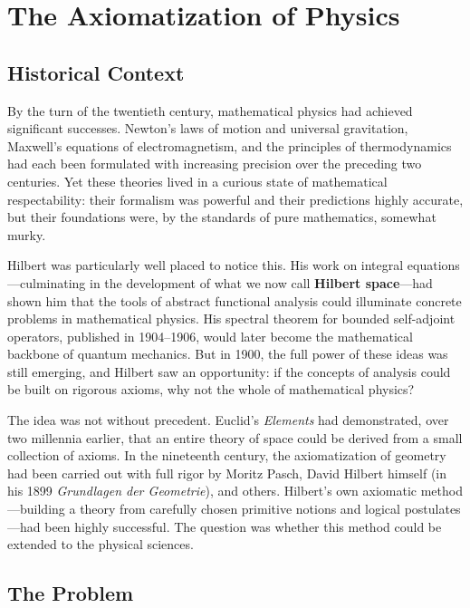 
\chapter{The Axiomatization of Physics}

\section{Historical Context}

By the turn of the twentieth century, mathematical physics had achieved significant successes. Newton's laws of motion and universal gravitation, Maxwell's equations of electromagnetism, and the principles of thermodynamics had each been formulated with increasing precision over the preceding two centuries. Yet these theories lived in a curious state of mathematical respectability: their formalism was powerful and their predictions highly accurate, but their foundations were, by the standards of pure mathematics, somewhat murky.

Hilbert was particularly well placed to notice this. His work on integral equations---culminating in the development of what we now call \textbf{Hilbert space}---had shown him that the tools of abstract functional analysis could illuminate concrete problems in mathematical physics. His spectral theorem for bounded self-adjoint operators, published in 1904--1906, would later become the mathematical backbone of quantum mechanics. But in 1900, the full power of these ideas was still emerging, and Hilbert saw an opportunity: if the concepts of analysis could be built on rigorous axioms, why not the whole of mathematical physics?

The idea was not without precedent. Euclid's \emph{Elements} had demonstrated, over two millennia earlier, that an entire theory of space could be derived from a small collection of axioms. In the nineteenth century, the axiomatization of geometry had been carried out with full rigor by Moritz Pasch, David Hilbert himself (in his 1899 \emph{Grundlagen der Geometrie}), and others. Hilbert's own axiomatic method---building a theory from carefully chosen primitive notions and logical postulates---had been highly successful. The question was whether this method could be extended to the physical sciences.

\section{The Problem}

